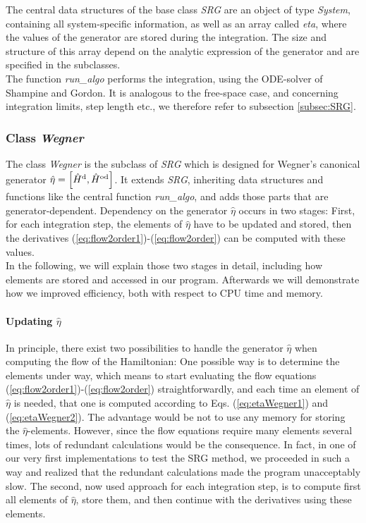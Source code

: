 The central data structures of the base class \textit{SRG} are an object of type \textit{System}, containing all system-specific information, as well as an array called \textit{eta}, where the values of the generator are stored during the integration. The size and structure of this array depend on the analytic expression of the generator and are specified in the subclasses.\\
The function \textit{run\_algo} performs the integration, using the ODE-solver of Shampine and Gordon. It is analogous to the free-space case, and concerning integration limits, step length etc., we therefore refer to subsection \ref{subsec:SRG}.

\subsubsection{Class \textit{Wegner}}

The class \textit{Wegner} is the subclass of \textit{SRG} which is designed for Wegner's canonical generator $\hat{\eta} = \left[ \hat{H}^{\rm d}, \hat{H}^{\rm od} \right]$. It extends \textit{SRG}, inheriting data structures and functions like the central function \textit{run\_algo}, and adds those parts that are generator-dependent. Dependency on the generator $\hat{\eta}$ occurs in two stages: First, for each integration step, the elements of $\hat{\eta}$ have to be updated and stored, then the derivatives (\ref{eq:flow2order1})-(\ref{eq:flow2order}) can be computed with these values. \\
In the following, we will explain those two stages in detail, including how elements are stored and accessed in our program. Afterwards we will demonstrate how we improved efficiency, both with respect to CPU time and memory.

\paragraph{Updating $\hat{\eta}$}
In principle, there exist two possibilities  to handle the generator $\hat{\eta}$ when computing the flow of the Hamiltonian: One possible way is to determine the elements under way, which means to start evaluating the flow equations (\ref{eq:flow2order1})-(\ref{eq:flow2order}) straightforwardly, and each time an element of $\hat{\eta}$ is needed, that one is computed according to Eqs. (\ref{eq:etaWegner1}) and (\ref{eq:etaWegner2}).
 The advantage would be not to use any memory for storing the $\hat{\eta}$-elements. 
 However, since the flow equations require many elements several times, lots of redundant calculations would be the consequence. 
 In fact, in one of our very first implementations to test the SRG method, we proceeded in such a way and realized that the redundant calculations made the program unacceptably slow. The second, now used approach for each integration step,  is to compute first all elements of $\hat{\eta}$, store them, and then continue with the derivatives using these elements. 


